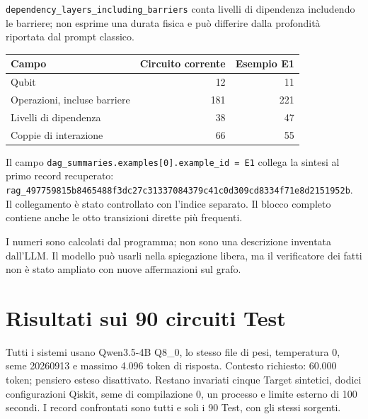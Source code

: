 \documentclass[a4paper,10pt]{article}
\begin{document}
\texttt{dependency\_layers\_including\_barriers} conta livelli di dipendenza
includendo le barriere; non esprime una durata fisica e può differire dalla
profondità riportata dal prompt classico.
\par\medskip\begingroup\small\renewcommand{\arraystretch}{1.18}\setlength{\tabcolsep}{5pt}
\begin{tabularx}{\linewidth}{Xrr}\toprule
Campo & Circuito corrente & Esempio E1\\\midrule
Qubit & 12 & 11\\
Operazioni, incluse barriere & 181 & 221\\
Livelli di dipendenza & 38 & 47\\
Coppie di interazione & 66 & 55\\
\bottomrule\end{tabularx}\endgroup\par
\small Il campo \texttt{dag\_summaries.examples[0].example\_id = E1} collega la sintesi al primo record recuperato: \nolinkurl{rag_497759815b8465488f3dc27c31337084379c41c0d309cd8334f71e8d2151952b}. Il collegamento è stato controllato con l'indice separato. Il blocco completo contiene anche le otto transizioni dirette più frequenti.\normalsize\par I numeri sono calcolati dal programma; non sono una descrizione inventata
dall'LLM. Il modello può usarli nella spiegazione libera, ma il verificatore dei
fatti non è stato ampliato con nuove affermazioni sul grafo.
\clearpage\section{Risultati sui 90 circuiti Test}
Tutti i sistemi usano Qwen3.5-4B Q8\_0, lo stesso file di pesi,
temperatura 0, seme 20260913 e massimo 4.096 token di risposta.
Contesto richiesto: 60.000 token; pensiero esteso disattivato.
Restano invariati cinque Target sintetici, dodici configurazioni Qiskit,
seme di compilazione 0, un processo e limite esterno di 100 secondi.
I record confrontati sono tutti e soli i 90 Test, con gli stessi sorgenti.
\end{document}
